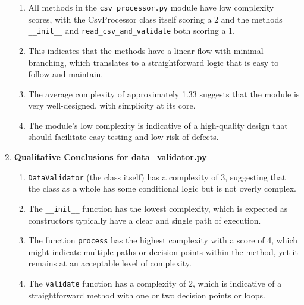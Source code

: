 \begin{enumerate}
\begin{enumerate}
    \item All methods in the \texttt{csv\_processor.py} module have low complexity scores, with the CsvProcessor class itself scoring a 2 and the methods \texttt{\_\_init\_\_} and \texttt{read\_csv\_and\_validate} both scoring a 1. 
    \item This indicates that the methods have a linear flow with minimal branching, which translates to a straightforward logic that is easy to follow and maintain.
    \item The average complexity of approximately 1.33 suggests that the module is very well-designed, with simplicity at its core. 
    \item The module's low complexity is indicative of a high-quality design that should facilitate easy testing and low risk of defects.
\end{enumerate}

\item \textbf{Qualitative Conclusions for data\_validator.py}\\

\begin{enumerate}
    \item \texttt{DataValidator} (the class itself) has a complexity of 3, suggesting that the class as a whole has some conditional logic but is not overly complex. 
    \item The \texttt{\_\_init\_\_} function has the lowest complexity, which is expected as constructors typically have a clear and single path of execution.
    \item The function \texttt{process} has the highest complexity with a score of 4, which might indicate multiple paths or decision points within the method, yet it remains at an acceptable level of complexity. 
    \item The \texttt{validate} function has a complexity of 2, which is indicative of a straightforward method with one or two decision points or loops. 
\end{enumerate}

\end{enumerate}

\pagebreak
